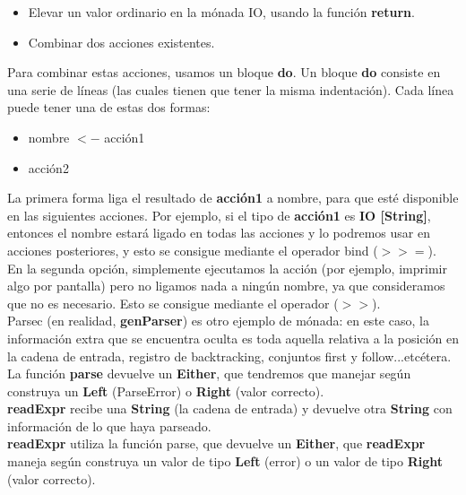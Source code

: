 \begin{itemize}
  \item Elevar un valor ordinario en la m\'onada IO, usando la funci\'on \textbf{return}.
  \item Combinar dos acciones existentes.
\end{itemize}

Para combinar estas acciones, usamos un bloque \textbf{do}. Un bloque \textbf{do} consiste en una serie de l\'ineas (las cuales tienen que tener la misma indentaci\'on). Cada l\'inea puede tener una de estas dos formas:

\begin{itemize}
  \item nombre $<-$ acci\'on1
  \item acci\'on2
\end{itemize}

La primera forma liga el resultado de \textbf{acci\'on1} a nombre, para que est\'e disponible en las siguientes acciones. Por ejemplo, si el tipo de \textbf{acci\'on1} es \textbf{IO [String]}, entonces el nombre estar\'a ligado en todas las acciones y lo podremos usar en acciones posteriores, y esto se consigue mediante el operador bind ($>>=$).\\

En la segunda opci\'on, simplemente ejecutamos la acci\'on (por ejemplo, imprimir algo por pantalla) pero no ligamos nada a ning\'un nombre, ya que consideramos que no es necesario. Esto se consigue mediante el operador ($>>$).\\

Parsec (en realidad, \textbf{genParser}) es otro ejemplo de m\'onada: en este caso, la informaci\'on extra que se encuentra oculta es toda aquella relativa a la posici\'on en la cadena de entrada, registro de backtracking, conjuntos first y follow...etc\'etera.\\

La funci\'on \textbf{parse} devuelve un \textbf{Either}, que tendremos que manejar seg\'un construya un \textbf{Left} (ParseError) o \textbf{Right} (valor correcto).\\

\textbf{readExpr} recibe una \textbf{String} (la cadena de entrada) y devuelve otra \textbf{String} con informaci\'on de lo que haya parseado.\\

\textbf{readExpr} utiliza la funci\'on parse, que devuelve un \textbf{Either}, que \textbf{readExpr} maneja seg\'un construya un valor de tipo \textbf{Left} (error) o un valor de tipo \textbf{Right} (valor correcto).\\


